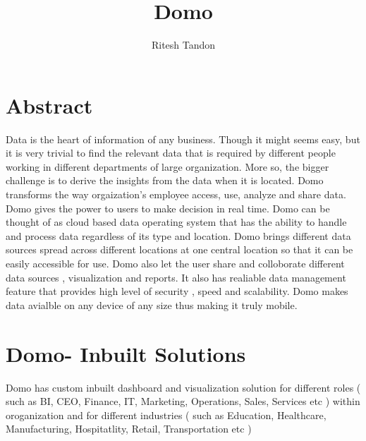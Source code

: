 
\title{Domo}

\author{Ritesh Tandon}

\maketitle

\renewcommand{\shortauthors}{R. Tandon}

\section{Abstract}

Data is the heart of information of any business. 
Though it might seems easy, but it is very trivial 
to find the relevant data that is required by different 
people working in different departments of large organization. 
More so, the bigger challenge is to derive the insights 
from the data when it is located.
Domo transforms the way orgaization's employee access, use, 
analyze and share data. Domo gives the power to users to 
make decision in real time. Domo can be thought of as cloud 
based data operating system that has the ability to handle 
and process data regardless of its type and location. 
Domo brings different data sources spread across different 
locations at one central location so that it can be easily 
accessible for use. Domo also let the user share and 
colloborate different data sources , visualization and 
reports. It also has realiable data management feature 
that provides high level of security , speed and scalability. 
Domo makes data avialble on any device of any size thus 
making it truly mobile.




\section{Domo- Inbuilt Solutions}

Domo has custom inbuilt dashboard and visualization solution 
for different roles ( such as BI, CEO, Finance, IT, Marketing, 
Operations, Sales, Services etc )  within oroganization and 
for different industries ( such as Education, Healthcare, 
Manufacturing, Hospitatlity, Retail, Transportation etc )


